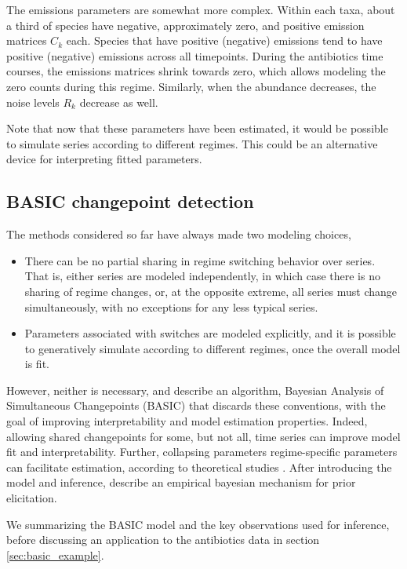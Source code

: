 \documentclass{article}
\begin{document}
The emissions parameters are somewhat more complex. Within each taxa, about a
third of species have negative, approximately zero, and positive emission
matrices $C_{k}$ each. Species that have positive (negative) emissions tend to
have positive (negative) emissions across all timepoints. During the antibiotics
time courses, the emissions matrices shrink towards zero, which allows modeling
the zero counts during this regime. Similarly, when the abundance decreases, the
noise levels $R_k$ decrease as well.

Note that now that these parameters have been estimated, it would be possible to
simulate series according to different regimes. This could be an alternative
device for interpreting fitted parameters.

\subsection{BASIC changepoint detection}

The methods considered so far have always made two modeling choices,
\begin{itemize}
\item There can be no partial sharing in regime switching behavior over series.
  That is, either series are modeled independently, in which case there is no
  sharing of regime changes, or, at the opposite extreme, all series must change
  simultaneously, with no exceptions for any less typical series.
\item Parameters associated with switches are modeled explicitly, and it is
  possible to generatively simulate according to different regimes, once the
  overall model is fit.
\end{itemize}

However, neither is necessary, and \cite{fan2015empirical} describe an
algorithm, Bayesian Analysis of Simultaneous Changepoints (BASIC) that discards
these conventions, with the goal of improving interpretability and model
estimation properties. Indeed, allowing shared changepoints for some, but not
all, time series can improve model fit and interpretability. Further, collapsing
parameters regime-specific parameters can facilitate estimation, according to
theoretical studies \citep{liu1994collapsed}. After introducing the model and
inference, \cite{fan2015empirical} describe an empirical bayesian mechanism for
prior elicitation.

We summarizing the BASIC model and the key observations used for inference,
before discussing an application to the antibiotics data in section
\ref{sec:basic_example}.
\end{document}
